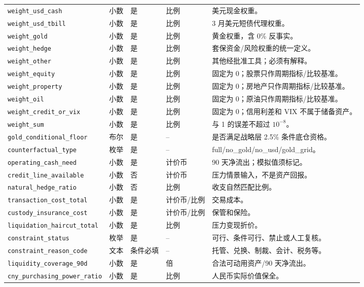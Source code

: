 \documentclass[UTF8,fontset=windows,12pt,openany]{ctexbook}
\newcommand{\Field}[1]{{\small\nolinkurl{#1}}}
\begin{document}
\begin{landscape}
\begin{longtable}{p{4.0cm}p{2.2cm}p{2.2cm}p{2.5cm}p{7.4cm}}
\Field{weight_usd_cash} & 小数 & 是 & 比例 & 美元现金权重。\\
\Field{weight_usd_tbill} & 小数 & 是 & 比例 & 3 月美元短债代理权重。\\
\Field{weight_gold} & 小数 & 是 & 比例 & 黄金权重，含 0\% 反事实。\\
\Field{weight_hedge} & 小数 & 是 & 比例 & 套保资金/风险权重的统一定义。\\
\Field{weight_other} & 小数 & 是 & 比例 & 其他经批准工具；必须有解释。\\
\Field{weight_equity} & 小数 & 是 & 比例 & 固定为 0；股票只作周期指标/比较基准。\\
\Field{weight_property} & 小数 & 是 & 比例 & 固定为 0；房地产只作周期指标/比较基准。\\
\Field{weight_oil} & 小数 & 是 & 比例 & 固定为 0；原油只作周期指标/比较基准。\\
\Field{weight_credit_or_vix} & 小数 & 是 & 比例 & 固定为 0；信用利差和 VIX 不属于储备资产。\\
\Field{weight_sum} & 小数 & 是 & 比例 & 与 1 的误差不超过 \(10^{-8}\)。\\
\Field{gold_conditional_floor} & 布尔 & 是 & -- & 是否满足战略层 2.5\% 条件底仓资格。\\
\Field{counterfactual_type} & 枚举 & 是 & -- & full/no\_gold/no\_usd/gold\_grid。\\
\Field{operating_cash_need} & 小数 & 是 & 计价币 & 90 天净流出；模拟值须标记。\\
\Field{credit_line_available} & 小数 & 否 & 计价币 & 压力情景输入，不是资产回报。\\
\Field{natural_hedge_ratio} & 小数 & 否 & 比例 & 收支自然匹配比例。\\
\Field{transaction_cost_total} & 小数 & 是 & 计价币/比例 & 交易成本。\\
\Field{custody_insurance_cost} & 小数 & 是 & 计价币/比例 & 保管和保险。\\
\Field{liquidation_haircut_total} & 小数 & 是 & 比例 & 压力变现折价。\\
\Field{constraint_status} & 枚举 & 是 & -- & 可行、条件可行、禁止或人工复核。\\
\Field{constraint_reason_code} & 文本 & 条件必填 & -- & 托管、兑换、制裁、会计、税务等。\\
\Field{liquidity_coverage_90d} & 小数 & 是 & 倍 & 合法可动用资产/90 天净流出。\\
\Field{cny_purchasing_power_ratio} & 小数 & 是 & 比例 & 人民币实际价值保全。\\

\end{longtable}
\end{landscape}
\end{document}
